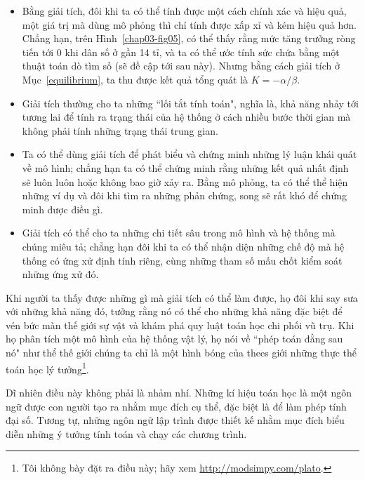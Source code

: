 \documentclass[12pt]{book}
\theoremstyle{exercise}
\begin{document}
\begin{itemize}

\item Bằng giải tích, đôi khi ta có thể tính được một cách chính xác và hiệu quả, một giá trị mà dùng mô phỏng thì chỉ tính được xấp xỉ và kém hiệu quả hơn. Chẳng hạn, trên Hình~\ref{chap03-fig05}, có thể thấy rằng mức tăng trưởng ròng tiến tới 0 khi dân số ở gần 14 tỉ, và ta có thể ước tính sức chứa bằng một thuật toán dò tìm số (sẽ đề cập tới sau này). Nhưng bằng cách giải tích ở Mục~\ref{equilibrium}, ta thu được kết quả tổng quát là $K=-\alpha/\beta$.

\item Giải tích thường cho ta những ``lối tắt tính toán", nghĩa là, khả năng nhảy tới tương lai để tính ra trạng thái của hệ thống ở cách nhiều bước thời gian mà không phải tính những trạng thái trung gian.


\item Ta có thể dùng giải tích để phát biểu và chứng minh những lý luận khái quát về mô hình; chẳng hạn ta có thể chứng minh rằng những kết quả nhất định sẽ luôn luôn hoặc không bao giờ xảy ra. Bằng mô phỏng, ta có thể thể hiện những ví dụ và đôi khi tìm ra những phản chứng, song sẽ rất khó để chứng minh được điều gì.


\item Giải tích có thể cho ta những chi tiết sâu trong mô hình và hệ thống mà chúng miêu tả; chẳng hạn đôi khi ta có thể nhận diện những chế độ mà hệ thống có ứng xử định tính riêng, cùng những tham số mấu chốt kiểm soát những ứng xử đó.


\end{itemize}

Khi người ta thấy được những gì mà giải tích có thể làm được, họ đôi khi say sưa với những khả năng đó, tưởng rằng nó có thể cho những khả năng đặc biệt để vén bức màn thế giới sự vật và khám phá quy luật toán học chi phối vũ trụ. Khi họ phân tích một mô hình của hệ thống vật lý, họ nói về ``phép toán đằng sau nó" như thể thế giới chúng ta chỉ là một hình bóng của thees giới những thực thể toán học lý tưởng\footnote{Tôi không bày đặt ra điều này; hãy xem  \url{http://modsimpy.com/plato}.}.


Dĩ nhiên điều này không phải là nhảm nhí. Những kí hiệu toán học là một ngôn ngữ được con người tạo ra nhằm mục đích cụ thể, đặc biệt là để làm phép tính đại số. Tương tự, những ngôn ngữ lập trình được thiết kế nhằm mục đích biểu diễn những ý tưởng tính toán và chạy các chương trình.
\end{document}
